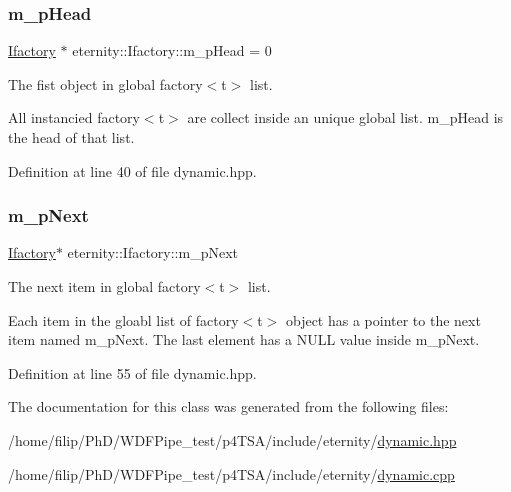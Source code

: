 \subsubsection{\texorpdfstring{m\+\_\+p\+Head}{m\_pHead}}
{\footnotesize\ttfamily \hyperlink{classeternity_1_1_ifactory}{Ifactory} $\ast$ eternity\+::\+Ifactory\+::m\+\_\+p\+Head = 0\hspace{0.3cm}{\ttfamily [static]}}



The fist object in global factory$<$t$>$ list. 

All instancied factory$<$t$>$ are collect inside an unique global list. m\+\_\+p\+Head is the head of that list. 

Definition at line 40 of file dynamic.\+hpp.

\mbox{\label{classeternity_1_1_ifactory_a6749c6d3f8aea62a3084c0825f0687c5}} 
\subsubsection{\texorpdfstring{m\+\_\+p\+Next}{m\_pNext}}
{\footnotesize\ttfamily \hyperlink{classeternity_1_1_ifactory}{Ifactory}$\ast$ eternity\+::\+Ifactory\+::m\+\_\+p\+Next}



The next item in global factory$<$t$>$ list. 

Each item in the gloabl list of factory$<$t$>$ object has a pointer to the next item named m\+\_\+p\+Next. The last element has a N\+U\+LL value inside m\+\_\+p\+Next. 

Definition at line 55 of file dynamic.\+hpp.



The documentation for this class was generated from the following files\+:\begin{DoxyCompactItemize}
\item 
/home/filip/\+Ph\+D/\+W\+D\+F\+Pipe\+\_\+test/p4\+T\+S\+A/include/eternity/\hyperlink{dynamic_8hpp}{dynamic.\+hpp}\item 
/home/filip/\+Ph\+D/\+W\+D\+F\+Pipe\+\_\+test/p4\+T\+S\+A/include/eternity/\hyperlink{dynamic_8cpp}{dynamic.\+cpp}\end{DoxyCompactItemize}
